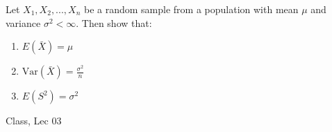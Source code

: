 \begin{samepage}
\begin{ex}
    Let $X_1, X_2, ..., X_n$ be a random sample from a population with mean $\mu $ and variance $\sigma ^2 < \infty$. Then show that:
    \begin{enumerate}
        \item $E\left (\bar{X}\right ) = \mu $
        \item $\text{Var}\left (\bar{X}\right ) = \frac{\sigma ^2}{n}$
        \item $E\left (S ^2\right ) = \sigma ^2$
    \end{enumerate}
\end{ex}
\begin{source}
Class, Lec 03
\end{source}
\end{samepage}
